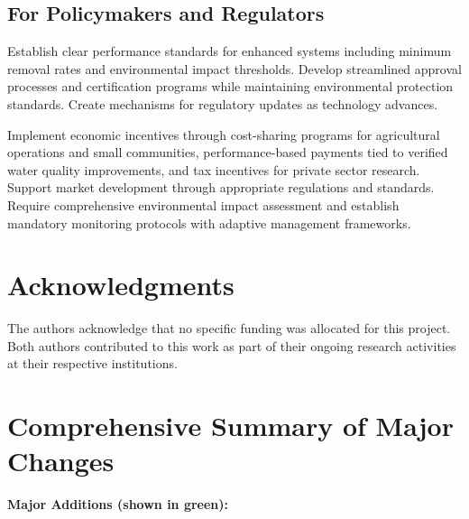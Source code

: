 \documentclass[12pt,a4paper]{article}
\begin{document}
{\subsection{For Policymakers and Regulators}

Establish clear performance standards for enhanced systems including minimum removal rates and environmental impact thresholds. Develop streamlined approval processes and certification programs while maintaining environmental protection standards. Create mechanisms for regulatory updates as technology advances.

Implement economic incentives through cost-sharing programs for agricultural operations and small communities, performance-based payments tied to verified water quality improvements, and tax incentives for private sector research. Support market development through appropriate regulations and standards. Require comprehensive environmental impact assessment and establish mandatory monitoring protocols with adaptive management frameworks.}

\section{Acknowledgments}

The authors acknowledge that no specific funding was allocated for this project. Both authors contributed to this work as part of their ongoing research activities at their respective institutions.




\clearpage

\section*{Comprehensive Summary of Major Changes}

\textbf{\textcolor{addedtext}{Major Additions (shown in green):}}
\end{document}
